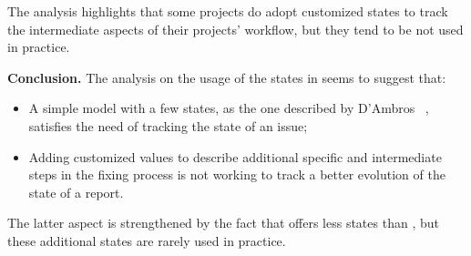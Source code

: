 The analysis highlights that some projects do adopt customized states to track the intermediate aspects of their projects' workflow, but they tend to be not used in practice.

\textbf{Conclusion.} The analysis on the usage of the states in  seems to suggest that:
\begin{itemize}[$\circ$]
\item A simple model with a few states, as the one described by D'Ambros \etal~\cite{DAmb2007b}, satisfies the need of tracking the state of an issue;
\item Adding customized values to  describe additional specific and intermediate steps in the fixing process is not working to track a better evolution of the state of a report. 
\end{itemize}

The latter aspect is strengthened by the fact that \jira offers less states than \bzilla, but these additional states are rarely used in practice.



%
%

